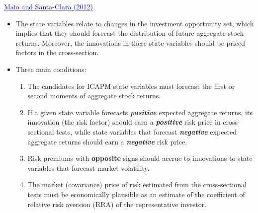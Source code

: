 \documentclass{beamer}
\begin{document}
\begin{frame}{\href{https://doi.org/10.1016/j.jfineco.2012.07.001}{\textcolor{blue}{Maio and Santa-Clara (2012)}}}
	\begin{itemize}
		\item The state variables relate to changes in the investment opportunity set, which implies that they should forecast the distribution of future aggregate stock returns. Moreover, the innovations in these state variables should be priced factors in the cross-section.
		\item Three main conditions:
		\begin{enumerate}
			\item  The candidates for ICAPM state variables must forecast the first or second moments of aggregate stock returns.
			\item  If a given state variable forecasts \textit{\textbf{positive}} expected aggregate returns, its innovation (the risk factor) should earn a \textit{\textbf{positive}} risk price in cross-sectional tests, while state variables that forecast \textit{\textbf{negative}} expected aggregate returns should earn a \textit{\textbf{negative}} risk price.
			\item  Risk premiums with \textbf{opposite} signs should accrue to innovations to state variables that forecast market volatility.
			\item The market (covariance) price of risk estimated from the cross-sectional tests must be economically plausible as an estimate of the coefficient of relative risk aversion (RRA) of the representative investor.
		\end{enumerate}
	\end{itemize}
\end{frame}
\end{document}
